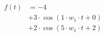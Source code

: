 \begin{center}
\begin{align*}
f(t)
&= -4 \\
&+ 3 \cdot \cos( 1 \cdot w_1 \cdot t + 0) \\
&+ 2 \cdot \cos( 5 \cdot w_1 \cdot t + 2)
\end{align*}
\end{center}
